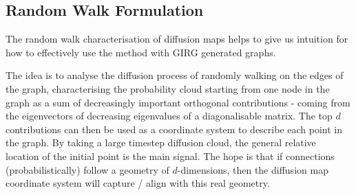 


\subsection{Random Walk Formulation}
\label{sec:diff_maps_theory}
The random walk characterisation of diffusion maps helps to give us intuition for how to effectively use the method with GIRG generated graphs.

The idea is to analyse the diffusion process of randomly walking on the edges of the graph, characterising the probability cloud starting from one node in the graph as a sum of decreasingly important orthogonal contributions - coming from the eigenvectors of decreasing eigenvalues of a diagonalisable matrix.
The top $d$ contributions can then be used as a coordinate system to describe each point in the graph. By taking a large timestep diffusion cloud, the general relative location of the initial point is the main signal. The hope is that if connections (probabilistically) follow a geometry of $d$-dimensions, then the diffusion map coordinate system will capture / align with this real geometry.

